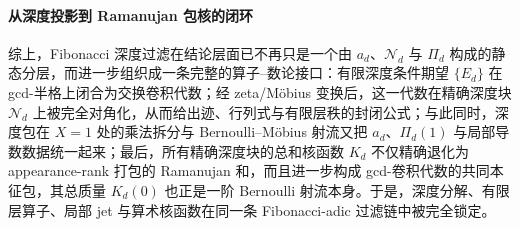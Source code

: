 \paragraph{从深度投影到 Ramanujan 包核的闭环}
综上，Fibonacci 深度过滤在结论层面已不再只是一个由 \(a_d\)、\(\mathcal N_d\) 与 \(\Pi_d\) 构成的静态分层，而进一步组织成一条完整的算子--数论接口：有限深度条件期望 \(\{E_d\}\) 在 gcd-半格上闭合为交换卷积代数；经 zeta/Möbius 变换后，这一代数在精确深度块 \(\mathcal N_d\) 上被完全对角化，从而给出迹、行列式与有限层秩的封闭公式；与此同时，深度包在 \(X=1\) 处的乘法拆分与 Bernoulli--Möbius 射流又把 \(a_d\)、\(\Pi_d(1)\) 与局部导数数据统一起来；最后，所有精确深度块的总和核函数 \(K_d\) 不仅精确退化为 appearance-rank 打包的 Ramanujan 和，而且进一步构成 gcd-卷积代数的共同本征包，其总质量 \(K_d(0)\) 也正是一阶 Bernoulli 射流本身。于是，深度分解、有限层算子、局部 jet 与算术核函数在同一条 Fibonacci-adic 过滤链中被完全锁定。

\endinput
